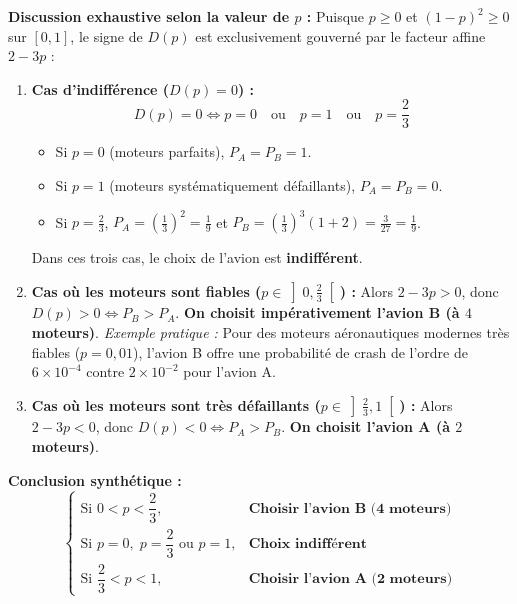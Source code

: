 \documentclass[11pt,a4paper]{article}
\begin{document}
\begin{correctionbox}
\textbf{Discussion exhaustive selon la valeur de $p$ :}
Puisque $p \ge 0$ et $(1-p)^2 \ge 0$ sur $[0, 1]$, le signe de $D(p)$ est exclusivement gouverné par le facteur affine $2 - 3p$ :
\begin{enumerate}
    \item \textbf{Cas d'indifférence ($D(p) = 0$) :}
    \[
    D(p) = 0 \iff p = 0 \quad \text{ou} \quad p = 1 \quad \text{ou} \quad p = \frac{2}{3}
    \]
    \begin{itemize}[label=$\bullet$]
        \item Si $p = 0$ (moteurs parfaits), $P_A = P_B = 1$.
        \item Si $p = 1$ (moteurs systématiquement défaillants), $P_A = P_B = 0$.
        \item Si $p = \frac{2}{3}$, $P_A = \left(\frac{1}{3}\right)^2 = \frac{1}{9}$ et $P_B = \left(\frac{1}{3}\right)^3 (1+2) = \frac{3}{27} = \frac{1}{9}$.
    \end{itemize}
    Dans ces trois cas, le choix de l'avion est \textbf{indifférent}.

    \item \textbf{Cas où les moteurs sont fiables ($p \in \left]0, \frac{2}{3}\right[$) :}
    Alors $2 - 3p > 0$, donc $D(p) > 0 \iff P_B > P_A$.
    \textbf{On choisit impérativement l'avion B (à $4$ moteurs)}.
    \emph{Exemple pratique :} Pour des moteurs aéronautiques modernes très fiables ($p = 0{,}01$), l'avion B offre une probabilité de crash de l'ordre de $6 \times 10^{-4}$ contre $2 \times 10^{-2}$ pour l'avion A.

    \item \textbf{Cas où les moteurs sont très défaillants ($p \in \left]\frac{2}{3}, 1\right[$) :}
    Alors $2 - 3p < 0$, donc $D(p) < 0 \iff P_A > P_B$.
    \textbf{On choisit l'avion A (à $2$ moteurs)}.
\end{enumerate}

\textbf{Conclusion synthétique :}
\[
\begin{cases}
    \text{Si } 0 < p < \dfrac{2}{3}, & \textbf{Choisir l'avion B (4 moteurs)} \\[0.25cm]
    \text{Si } p = 0, \; p = \dfrac{2}{3} \text{ ou } p = 1, & \textbf{Choix indifférent} \\[0.25cm]
    \text{Si } \dfrac{2}{3} < p < 1, & \textbf{Choisir l'avion A (2 moteurs)}
\end{cases}
\]
\end{correctionbox}
\end{document}
